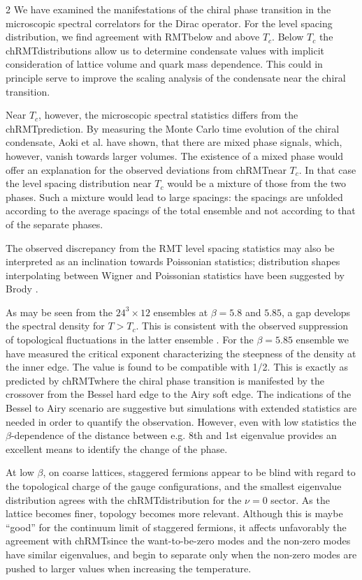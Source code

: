 \begin{multicols}{2}
We have examined the manifestations of the chiral phase transition in the
microscopic spectral correlators for the Dirac operator. For the level 
spacing distribution, we find agreement with
RMT\space below and above $T_c$. Below $T_c$ the chRMT\space distributions
allow us to determine condensate values with implicit consideration of lattice
volume and quark mass dependence. This could in principle serve to improve the
scaling analysis of the condensate near the chiral transition.

Near $T_c$, however, the microscopic spectral statistics differs from the
chRMT\space prediction.   By measuring the Monte Carlo time evolution of the
chiral condensate, Aoki et al. \cite{AoFuHa98} have shown, that there are mixed
phase signals, which, however, vanish towards larger volumes. The existence of
a mixed phase would offer an explanation for the observed deviations from 
chRMT\space  near $T_c$. In that case the level spacing distribution near $T_c$
would be a mixture of those from the two phases. Such a mixture would lead to
large spacings: the spacings are unfolded according to the average spacings of
the total ensemble and not according to that of the separate phases.

The observed discrepancy from the RMT level spacing statistics may also be
interpreted as an inclination towards Poissonian statistics; distribution
shapes interpolating between Wigner and Poissonian statistics have been
suggested by Brody \cite{Br73}. 

As may be seen from the $24^3\times 12$ ensembles at $\beta=5.8$ and $5.85$, a
gap develops the spectral density for $T>T_c$. This is consistent with the 
observed  suppression of topological fluctuations in the latter ensemble
\cite{FoGaHe98}. For the $\beta=5.85$ ensemble we have measured the critical
exponent characterizing the steepness of the density at the inner edge. The
value is found to be compatible with 1/2. This is exactly as predicted by
chRMT\space where the chiral phase transition is manifested by the crossover
from the Bessel hard edge to the Airy soft edge. The indications of the Bessel
to Airy scenario are suggestive but simulations with extended statistics are
needed in order to quantify the observation. However, even with low statistics 
the $\beta$-dependence of the distance between e.g. 8th and 1st eigenvalue
provides an excellent means to  identify the change of the phase.

At low $\beta$, on coarse lattices, staggered fermions appear to be blind with
regard to the topological charge of the gauge configurations, and the smallest
eigenvalue distribution agrees with the chRMT\space distribution for the
$\nu=0$ sector. As the lattice becomes finer, topology becomes more relevant.
Although this is maybe ``good'' for the continuum limit of staggered fermions, 
it affects unfavorably the agreement with chRMT\space since the want-to-be-zero
modes and the non-zero modes have similar eigenvalues, and begin to separate
only when the non-zero modes are pushed to larger values when  increasing the
temperature.


\end{multicols}
